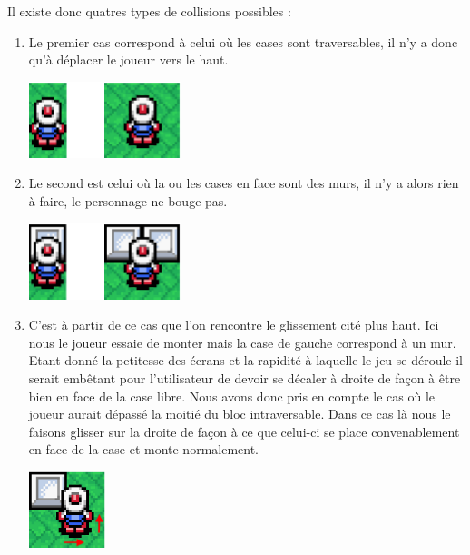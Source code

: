 \begin{enumerate}
				  		Il existe donc quatres types de collisions possibles :
				  		
				  		\begin{enumerate}

				  		  \item Le premier cas correspond à celui où les cases sont
				  		  traversables, il n'y a donc qu'à déplacer le joueur vers le haut.

							\begin{center}						
								\includegraphics[width=168px,height=84px]{Developpement/Img/ok2.eps}
							\end{center}

				  		  \item Le second est celui où la ou les cases en face sont des murs, il
				  		  n'y a alors rien à faire, le personnage ne bouge pas.
				  		  				  		  
				  		  	\begin{center}						
								\includegraphics[width=168px,height=84px]{Developpement/Img/ko2.eps}
							\end{center}
							
				  		  \item C'est à partir de ce cas que l'on rencontre le glissement cité
				  		  plus haut.
				  		  Ici nous le joueur essaie de monter mais la case de gauche correspond à un
				  		  mur. Etant donné la petitesse des écrans et la rapidité à laquelle le
				  		  jeu se déroule il serait embêtant pour l'utilisateur de devoir se
				  		  décaler à droite de façon à être bien en face de la case libre.
				  		  Nous avons donc pris en compte le cas où le joueur aurait dépassé la
				  		  moitié du bloc intraversable. Dans ce cas là nous le faisons glisser
				  		  sur la droite de façon à ce que celui-ci se place convenablement en
				  		  face de la case et monte normalement.
				  		  
				  		  	\begin{center}						
								\includegraphics[width=84px,height=84px]{Developpement/Img/ko3.eps}
							\end{center}
				  		  

\end{enumerate}
\end{enumerate}
